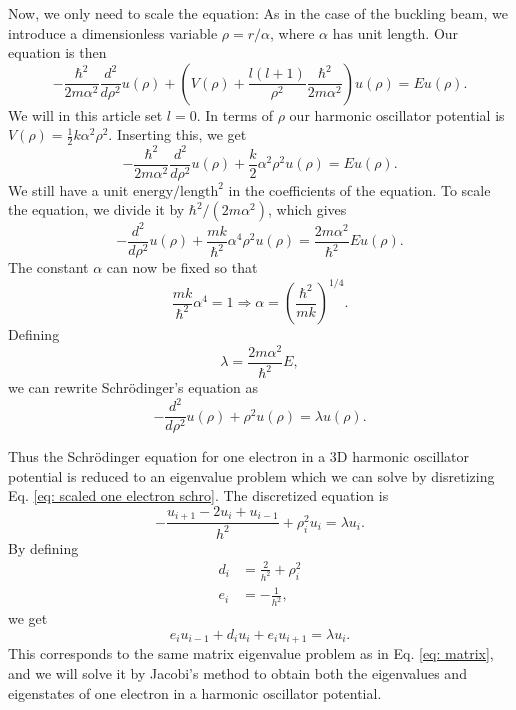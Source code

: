 \documentclass[%
 reprint,
nofootinbib,
aps,
]{revtex4-1}
\begin{document}
Now, we  only need to scale the equation:
As in the case of the buckling beam, we introduce a dimensionless variable $\rho = r/\alpha$, where $\alpha$ has unit length. Our equation is then
\begin{equation}
  -\frac{\hbar^2}{2 m \alpha^2} \frac{d^2}{d\rho^2} u(\rho)
       + \left ( V(\rho) + \frac{l (l + 1)}{\rho^2}
         \frac{\hbar^2}{2 m\alpha^2} \right ) u(\rho)  = E u(\rho) .
\end{equation}
We will in this article set $l=0$.  In terms of $\rho$ our harmonic oscillator potential is $V(\rho) = \frac{1}{2}k\alpha^2\rho^2$. Inserting this, we get
\begin{equation}
  -\frac{\hbar^2}{2 m \alpha^2} \frac{d^2}{d\rho^2} u(\rho)
       + \frac{k}{2} \alpha^2\rho^2u(\rho)  = E u(\rho) .
\end{equation}
We still have a unit $\mathrm{energy}/\mathrm{length}^2$ in the coefficients of the equation. To scale the equation, we divide it by $\hbar^2/(2 m \alpha^2)$, which gives
\begin{equation}
  -\frac{d^2}{d\rho^2} u(\rho)
       + \frac{mk}{\hbar^2} \alpha^4\rho^2u(\rho)  = \frac{2m\alpha^2}{\hbar^2}E u(\rho) .
\end{equation}
The constant $\alpha$ can now be fixed so that
\begin{equation}
\frac{mk}{\hbar^2} \alpha^4 = 1 \Rightarrow
\alpha = \left(\frac{\hbar^2}{mk}\right)^{1/4}.
\end{equation}
Defining
\begin{equation}\label{eq: lambda}
\lambda = \frac{2m\alpha^2}{\hbar^2}E,
\end{equation}
we can rewrite Schrödinger's equation as
\begin{equation}\label{eq: scaled one electron schro}
  -\frac{d^2}{d\rho^2} u(\rho) + \rho^2u(\rho)  = \lambda u(\rho).
\end{equation}

Thus the Schrödinger equation for one electron in a 3D harmonic oscillator potential is reduced to an eigenvalue problem which we can solve by disretizing Eq. \eqref{eq: scaled one electron schro}. The discretized equation is
\begin{equation}
-\frac{u_{i+1} -2u_i +u_{i-1}}{h^2}+\rho_i^2u_i = \lambda u_i.
\end{equation}
By defining
\begin{align}
d_i &= \frac{2}{h^2} + \rho_i^2\\
e_i &= -\frac{1}{h^2},
\end{align}
we get
\begin{equation}
e_i u_{i-1} + d_i u_i + e_iu_{i+1} =  \lambda u_i.
\end{equation}
This corresponds to the same matrix eigenvalue problem as in Eq. \eqref{eq: matrix}, and we will solve it by Jacobi's method to obtain both the eigenvalues and eigenstates of one electron in a harmonic oscillator potential.
\end{document}
